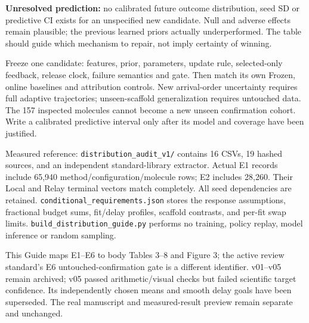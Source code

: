 \documentclass[10pt,letterpaper]{article}
\newcommand{\note}[1]{{\fontsize{8.5}{10.5}\selectfont #1\par}}
\newcommand{\sect}[1]{\vspace{5pt}{\large\bfseries #1}\par\vspace{2pt}}
\begin{document}
\textbf{Unresolved prediction:} no calibrated future outcome distribution, seed SD or predictive CI exists
for an unspecified new candidate. Null and adverse effects remain plausible; the previous learned
priors actually underperformed. The table should guide which mechanism to repair, not imply certainty of winning.

\sect{Before filling a prospective result matrix}
Freeze one candidate: features, prior, parameters, update rule, selected-only feedback, release clock,
failure semantics and gate. Then match its own Frozen, online baselines and attribution controls.
New arrival-order uncertainty requires full adaptive trajectories; unseen-scaffold generalization requires
untouched data. The 157 inspected molecules cannot become a new unseen confirmation cohort.
Write a calibrated predictive interval only after its model and coverage have been justified.

\sect{Evidence and reproducibility}
\note{\raggedright Measured reference: \texttt{distribution\_audit\_v1/} contains 16 CSVs, 19 hashed sources,
and an independent standard-library extractor. Actual E1 records include 65,940 method/configuration/molecule rows;
E2 includes 28,260. Their Local and Relay terminal vectors match completely.
All seed dependencies are retained. \texttt{conditional\_requirements.json} stores the response assumptions,
fractional budget sums, fit/delay profiles, scaffold contrasts, and per-fit swap limits.
\texttt{build\_distribution\_guide.py} performs no training, policy replay, model inference or random sampling.}

\note{This Guide maps E1--E6 to body Tables 3--8 and Figure 3; the active review standard's E6
untouched-confirmation gate is a different identifier. v01--v05 remain archived; v05 passed arithmetic/visual
checks but failed scientific target confidence. Its independently chosen means and smooth delay goals have
been superseded. The real manuscript and measured-result preview remain separate and unchanged.}
\end{document}
